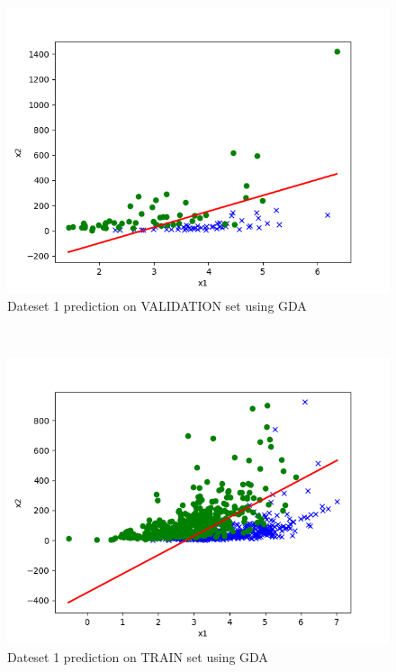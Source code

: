 \begin{answer}
\begin{figure}
\end{figure}\\
\begin{figure}
  \includegraphics[width=\linewidth]{../src/output/p01e_pred_1_eval.png}
  \caption{Dateset 1 prediction on VALIDATION set using GDA}
  \label{fig:Dateset 1 prediction on VALIDATION set using GDA}
\end{figure}\\
\begin{figure}
  \includegraphics[width=\linewidth]{../src/output/p01e_pred_1_train.png}
  \caption{Dateset 1 prediction on TRAIN set using GDA}
  \label{fig:Dateset 1 prediction on TRAIN set using GDA}
\end{figure}\\
\end{answer}
